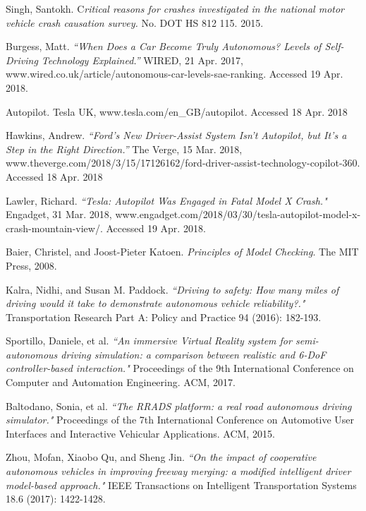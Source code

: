 \documentclass[a4paper]{article}
\begin{document}
\clearpage

\begin{thebibliography}{9}
Singh, Santokh. C\textit{ritical reasons for crashes investigated in the national motor vehicle crash causation survey.} No. DOT HS 812 115. 2015.

Burgess, Matt. \textit{``When Does a Car Become Truly Autonomous? Levels of Self-Driving Technology Explained.''} WIRED, 21 Apr. 2017, www.wired.co.uk/article/autonomous-car-levels-sae-ranking. Accessed 19 Apr. 2018.

Autopilot. Tesla UK, www.tesla.com/en\_GB/autopilot. Accessed 18 Apr. 2018

Hawkins, Andrew. \textit{``Ford's New Driver-Assist System Isn't Autopilot, but It's a Step in the Right Direction.''} The Verge, 15 Mar. 2018, www.theverge.com/2018/3/15/17126162/ford-driver-assist-technology-copilot-360. Accessed 18 Apr. 2018

Lawler, Richard. \textit{``Tesla: Autopilot Was Engaged in Fatal Model X Crash."} Engadget, 31 Mar. 2018, www.engadget.com/2018/03/30/tesla-autopilot-model-x-crash-mountain-view/. Accessed 19 Apr. 2018.

Baier, Christel, and Joost-Pieter Katoen. \textit{Principles of Model Checking}. The MIT Press, 2008.

Kalra, Nidhi, and Susan M. Paddock. \textit{``Driving to safety: How many miles of driving would it take to demonstrate autonomous vehicle reliability?."} Transportation Research Part A: Policy and Practice 94 (2016): 182-193.

Sportillo, Daniele, et al. \textit{``An immersive Virtual Reality system for semi-autonomous driving simulation: a comparison between realistic and 6-DoF controller-based interaction."} Proceedings of the 9th International Conference on Computer and Automation Engineering. ACM, 2017.

Baltodano, Sonia, et al. \textit{``The RRADS platform: a real road autonomous driving simulator."} Proceedings of the 7th International Conference on Automotive User Interfaces and Interactive Vehicular Applications. ACM, 2015.

Zhou, Mofan, Xiaobo Qu, and Sheng Jin. \textit{``On the impact of cooperative autonomous vehicles in improving freeway merging: a modified intelligent driver model-based approach."} IEEE Transactions on Intelligent Transportation Systems 18.6 (2017): 1422-1428.


\end{thebibliography}
\end{document}

